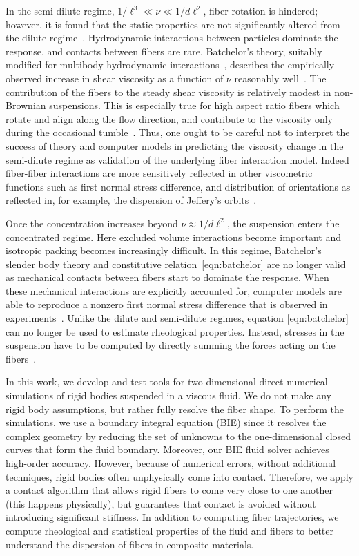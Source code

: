 \documentclass[preprint, 10pt]{elsarticle}
\begin{document}
In the semi-dilute regime, $1/\ell^3 \ll \nu \ll 1/d\ell^2$, fiber rotation is
hindered; however, it is found that the static properties are not
significantly altered from the dilute regime~\cite{larsoncf}.
Hydrodynamic interactions between particles dominate the response, and
contacts between fibers are rare. Batchelor's theory, suitably modified
for multibody hydrodynamic interactions~\cite{Shaqfeh1990,
Mackaplow1996}, describes the empirically observed increase in shear
viscosity as a function of $\nu$ reasonably well~\cite{Stover1992,
Bibbo1987, Petrich2000}. The contribution of the fibers to the steady
shear viscosity is relatively modest in non-Brownian suspensions. This
is especially true for high aspect ratio fibers which rotate and align
along the flow direction, and contribute to the viscosity only during
the occasional tumble~\cite{larsoncf}.  Thus, one ought to be careful
not to interpret the success of theory and computer models in predicting
the viscosity change in the semi-dilute regime as validation of the
underlying fiber interaction model. Indeed fiber-fiber interactions are
more sensitively reflected in other viscometric functions such as first
normal stress difference, and distribution of orientations as reflected
in, for example, the dispersion of Jeffery's
orbits~\cite{Lindstroem2009}.

Once the concentration increases beyond $\nu \approx 1/d\ell^2$, the
suspension enters the concentrated regime. Here excluded volume
interactions become important and isotropic packing becomes increasingly
difficult. In this regime, Batchelor's slender body theory and
constitutive relation~\eqref{eqn:batchelor} are no longer valid as
mechanical contacts between fibers start to dominate the response. When
these mechanical interactions are explicitly accounted for, computer
models are able to reproduce a nonzero first normal stress difference
that is observed in experiments~\cite{Sundararajakumar1997, Ausias2006,
Lindstroem2008}. Unlike the dilute and semi-dilute regimes, equation
\eqref{eqn:batchelor} can no longer be used to estimate rheological
properties. Instead, stresses in the suspension have to be computed by
directly summing the forces acting on the fibers~\cite{Ausias2006,
Lindstroem2008}.

In this work, we develop and test tools for two-dimensional direct
numerical simulations of rigid bodies suspended in a viscous fluid.  We
do not make any rigid body assumptions, but rather fully resolve the
fiber shape.  To perform the simulations, we use a boundary integral
equation (BIE) since it resolves the complex geometry by reducing the
set of unknowns to the one-dimensional closed curves that form the fluid
boundary.  Moreover, our BIE fluid solver achieves high-order accuracy.
However, because of numerical errors, without additional techniques,
rigid bodies often unphysically come into contact.  Therefore, we apply
a contact algorithm that allows rigid fibers to come very close to one
another (this happens physically), but guarantees that contact is
avoided without introducing significant stiffness.  In addition to
computing fiber trajectories, we compute rheological and statistical
properties of the fluid and fibers to better understand the dispersion
of fibers in composite materials.
\end{document}
